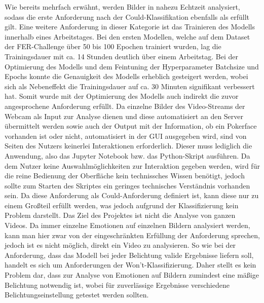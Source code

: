\documentclass[12pt, a4paper]{report}
\begin{document}
Wie bereits mehrfach erwähnt, werden Bilder in nahezu Echtzeit analysiert, sodass die erste Anforderung nach der Could-Klassifikation ebenfalls als erfüllt gilt. Eine weitere Anforderung in dieser Kategorie ist das Trainieren des Modells innerhalb eines Arbeitstages. Bei den ersten Modellen, welche auf dem Dataset der FER-Challenge über 50 bis 100 Epochen trainiert wurden, lag die Trainingsdauer mit ca. 14 Stunden deutlich über einem Arbeitstag. Bei der Optimierung des Modells und dem Feintuning der Hyperparameter Batchsize und Epochs konnte die Genauigkeit des Modells erheblich gesteigert werden, wobei sich als Nebeneffekt die Trainingsdauer auf ca. 30 Minuten signifikant verbessert hat. Somit wurde mit der Optimierung des Modells auch indirekt die zuvor angesprochene Anforderung erfüllt. Da einzelne Bilder des Video-Streams der Webcam als Input zur Analyse dienen und diese automatisiert an den Server übermittelt werden sowie auch der Output mit der Information, ob ein Pokerface vorhanden ist oder nicht, automatisiert in der GUI ausgegeben wird, sind von Seiten des Nutzers keinerlei Interaktionen erforderlich. Dieser muss lediglich die Anwendung, also das Jupyter Notebook bzw. das Python-Skript ausführen. Da dem Nutzer keine Auswahlmöglichkeiten zur Interaktion gegeben werden, wird für die reine Bedienung der Oberfläche kein technissches Wissen benötigt, jedoch sollte zum Starten des Skriptes ein geringes technisches Verständnis vorhanden sein. Da diese Anforderung als Could-Anforderung definiert ist, kann diese nur zu einem Großteil erfüllt werden, was jedoch aufgrund der Klassifizierung kein Problem darstellt.\newline
Das Ziel des Projektes ist nicht die Analyse von ganzen Videos. Da immer einzelne Emotionen auf einzelnen Bildern analysiert werden, kann man hier zwar von der eingeschränkten Erfüllung der Anforderung sprechen, jedoch ist es nicht möglich, direkt ein Video zu analysieren. So wie bei der Anforderung, dass das Modell bei jeder Belichtung valide Ergebnisse liefern soll, handelt es sich um Anforderungen der Won't-Klassifizierung. Daher stellt es kein Problem dar, dass zur Analyse von Emotionen auf Bildern zumindest eine mäßige Belichtung notwendig ist, wobei für zuverlässige Ergebnisse verschiedene Belichtungseinstellung getestet werden sollten.

\let\cleardoublepage\relax
\end{document}
